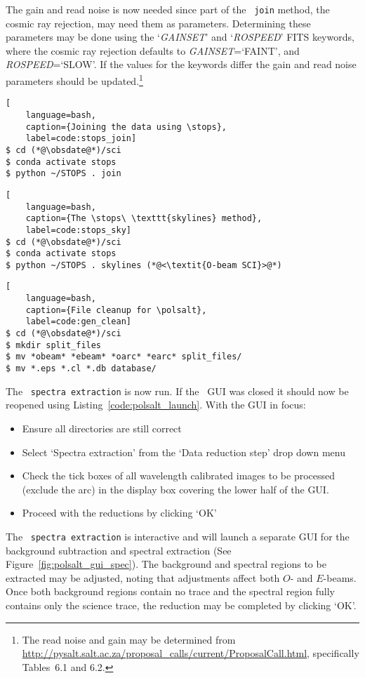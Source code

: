 The gain and read noise is now needed since part of the \stops\ \texttt{join} method, the cosmic ray rejection, may need them as parameters. Determining these parameters may be done using the `\textit{GAINSET}' and `\textit{ROSPEED}' \gls{FITS} keywords, where the cosmic ray rejection defaults to \textit{GAINSET}=`FAINT', and \textit{ROSPEED}=`SLOW'. If the values for the keywords differ the gain and read noise parameters should be updated.\footnote{The read noise and gain may be determined from \protect\url{http://pysalt.salt.ac.za/proposal_calls/current/ProposalCall.html}, specifically Tables~6.1 and 6.2.}

\begin{lstlisting}[
    language=bash,
    caption={Joining the data using \stops},
    label=code:stops_join]
$ cd (*@\obsdate@*)/sci
$ conda activate stops
$ python ~/STOPS . join
\end{lstlisting}

\begin{lstlisting}[
    language=bash,
    caption={The \stops\ \texttt{skylines} method},
    label=code:stops_sky]
$ cd (*@\obsdate@*)/sci
$ conda activate stops
$ python ~/STOPS . skylines (*@<\textit{O-beam SCI}>@*)
\end{lstlisting}

\begin{lstlisting}[
    language=bash,
    caption={File cleanup for \polsalt},
    label=code:gen_clean]
$ cd (*@\obsdate@*)/sci
$ mkdir split_files
$ mv *obeam* *ebeam* *oarc* *earc* split_files/
$ mv *.eps *.cl *.db database/
\end{lstlisting}

The \polsalt\ \texttt{spectra extraction} is now run. If the \polsalt\ \gls{GUI} was closed it should now be reopened using Listing~\ref{code:polsalt_launch}. With the \gls{GUI} in focus:
\begin{itemize}
    \item Ensure all directories are still correct
    \item Select `Spectra extraction' from the `Data reduction step' drop down menu
    \item Check the tick boxes of all wavelength calibrated images to be processed (exclude the arc) in the display box covering the lower half of the \gls{GUI}.
    \item Proceed with the reductions by clicking `OK'
\end{itemize}

The \polsalt\ \texttt{spectra extraction} is interactive and will launch a separate \gls{GUI} for the background subtraction and spectral extraction (See Figure~\ref{fig:polsalt_gui_spec}). The background and spectral regions to be extracted may be adjusted, noting that adjustments affect both $O$- and $E$-beams. Once both background regions contain no trace and the spectral region fully contains only the science trace, the reduction may be completed by clicking `OK'.

